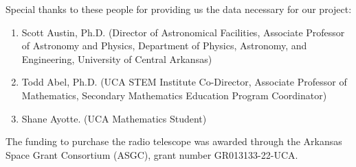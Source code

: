 \noindent Special thanks to these people for providing us the data necessary for our project:

\begin{enumerate}
    \item Scott Austin, Ph.D. (Director of Astronomical Facilities, Associate Professor of Astronomy and Physics, Department of Physics, Astronomy, and Engineering, University of Central Arkansas) 
    \item Todd Abel, Ph.D. (UCA STEM Institute Co-Director, Associate Professor of Mathematics, Secondary Mathematics Education Program Coordinator)
    \item Shane Ayotte. (UCA Mathematics Student)
\end{enumerate}

\noindent The funding to purchase the radio telescope was awarded through the Arkansas Space Grant Consortium (ASGC), grant number GR013133-22-UCA.